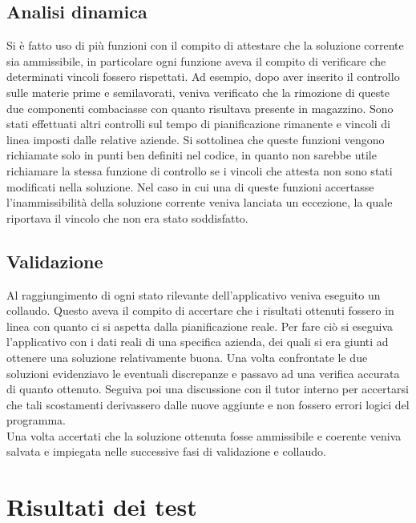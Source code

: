 \subsection{Analisi dinamica}

Si è fatto uso di più funzioni con il compito di attestare che la soluzione corrente sia ammissibile, in particolare ogni funzione aveva il compito di verificare che
determinati vincoli fossero rispettati. Ad esempio, dopo aver inserito il controllo sulle materie prime e semilavorati, veniva verificato che la rimozione di queste due componenti
combaciasse con quanto risultava presente in magazzino. Sono stati effettuati altri controlli sul tempo di pianificazione rimanente e vincoli di linea imposti dalle relative
aziende. Si sottolinea che queste funzioni vengono richiamate solo in punti ben definiti nel codice, in quanto non sarebbe utile richiamare la stessa funzione di controllo
se i vincoli che attesta non sono stati modificati nella soluzione. Nel caso in cui una di queste funzioni accertasse l'inammissibilità della soluzione corrente veniva 
lanciata un eccezione, la quale riportava il vincolo che non era stato soddisfatto.


\subsection{Validazione}

Al raggiungimento di ogni stato rilevante dell'applicativo veniva eseguito un collaudo. Questo aveva il compito di accertare che i risultati ottenuti fossero in linea con
quanto ci si aspetta dalla pianificazione reale. Per fare ciò si eseguiva l'applicativo con i dati reali di una specifica azienda, dei quali si era giunti ad ottenere
una soluzione relativamente buona. Una volta confrontate le due soluzioni evidenziavo le eventuali discrepanze e passavo ad una verifica accurata di quanto ottenuto.
Seguiva poi una discussione con il tutor interno per accertarsi che tali scostamenti derivassero dalle nuove aggiunte e non fossero errori logici del programma.\\ Una volta 
accertati che la soluzione ottenuta fosse ammissibile e coerente veniva salvata e impiegata nelle successive fasi di validazione e collaudo.

\section{Risultati dei test}

